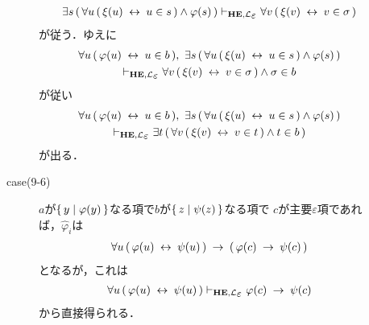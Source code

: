 \begin{metaprf}
\begin{description}
\begin{description}
\begin{align}
							\exists s\, (\, \forall u\, (\, \xi(u) \lrarrow u \in s\, ) \wedge \varphi(s)\, ) 
							\provable{\mbox{{\bf HE}},\lang{\varepsilon}} \forall v\, (\, \xi(v) \lrarrow v \in \sigma\, )
						\end{align}
						が従う．ゆえに
						\begin{align}
							\begin{gathered}
								\forall u\, (\, \varphi(u) \lrarrow u \in b\, ),\ 
								\exists s\, (\, \forall u\, (\, \xi(u) \lrarrow u \in s\, ) \wedge \varphi(s)\, ) \\
								\provable{\mbox{{\bf HE}},\lang{\varepsilon}} \forall v\, (\, \xi(v) \lrarrow v \in \sigma\, ) \wedge \sigma \in b
							\end{gathered}
						\end{align}
						が従い
						\begin{align}
							\begin{gathered}
								\forall u\, (\, \varphi(u) \lrarrow u \in b\, ),\ 
								\exists s\, (\, \forall u\, (\, \xi(u) \lrarrow u \in s\, ) \wedge \varphi(s)\, ) \\
								\provable{\mbox{{\bf HE}},\lang{\varepsilon}} \exists t\, (\, \forall v\, (\, \xi(v) \lrarrow v \in t\, ) \wedge t \in b\, )
							\end{gathered}
						\end{align}
						が出る．
						
					\item[case(9-6)] $a$が$\{\, y \mid \varphi(y)\, \}$なる項で$b$が$\{\, z \mid \psi(z)\, \}$なる項で
						$c$が主要$\varepsilon$項であれば，$\widehat{\varphi}_{i}$は
						\begin{align}
							\forall u\, (\, \varphi(u) \hspace{0.25em}\leftrightarrow\hspace{0.25em} \psi(u)\, ) \hspace{0.25em}\rightarrow\hspace{0.25em} (\, \varphi(c) \hspace{0.25em}\rightarrow\hspace{0.25em} \psi(c)\, )
						\end{align}
						となるが，これは
						\begin{align}
							\forall u\, (\, \varphi(u) \lrarrow \psi(u)\, ) 
							\provable{\mbox{{\bf HE}},\lang{\varepsilon}} 
							\varphi(c) \rarrow \psi(c)
						\end{align}
						から直接得られる．
						

\end{description}
\end{description}
\end{metaprf}

